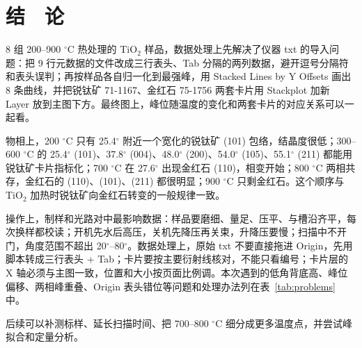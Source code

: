 \section{结　论}

8 组 200--900 $^\circ$C 热处理的 TiO$_2$ 样品，数据处理上先解决了仪器 txt 的导入问题：把 9 行元数据的文件改成三行表头、Tab 分隔的两列数据，避开逗号分隔符和表头误判；再按样品各自归一化到最强峰，用 Stacked Lines by Y Offsets 画出 8 条曲线，并把锐钛矿 71-1167、金红石 75-1756 两套卡片用 Stackplot 加新 Layer 放到主图下方。最终图上，峰位随温度的变化和两套卡片的对应关系可以一起看。

物相上，200 $^\circ$C 只有 25.4$^\circ$ 附近一个宽化的锐钛矿 (101) 包络，结晶度很低；300--600 $^\circ$C 的 25.4$^\circ$ (101)、37.8$^\circ$ (004)、48.0$^\circ$ (200)、54.0$^\circ$ (105)、55.1$^\circ$ (211) 都能用锐钛矿卡片指标化；700 $^\circ$C 在 27.6$^\circ$ 出现金红石 (110)，相变开始；800 $^\circ$C 两相共存，金红石的 (110)、(101)、(211) 都很明显；900 $^\circ$C 只剩金红石。这个顺序与 TiO$_2$ 加热时锐钛矿向金红石转变的一般规律一致。

操作上，制样和光路对中最影响数据：样品要磨细、量足、压平、与槽沿齐平，每次换样都校读；开机先水后高压，关机先降压再关束，升降压要慢；扫描中不开门，角度范围不超出 20$^\circ$--80$^\circ$。数据处理上，原始 txt 不要直接拖进 Origin，先用脚本转成三行表头 + Tab；卡片要按主要衍射线核对，不能只看编号；卡片层的 X 轴必须与主图一致，位置和大小按页面比例调。本次遇到的低角背底高、峰位偏移、两相峰重叠、Origin 表头错位等问题和处理办法列在表~\ref{tab:problems} 中。

后续可以补测标样、延长扫描时间、把 700--800 $^\circ$C 细分成更多温度点，并尝试峰拟合和定量分析。

